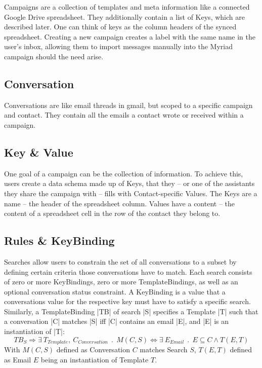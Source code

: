 Campaigns are a collection of templates and meta information like a connected Google Drive spreadsheet. They additionally contain a list of Keys, which are described later. One can think of keys as the column headers of the synced spreadsheet. Creating a new campaign creates a label with the same name in the user's inbox, allowing them to import messages manually into the Myriad campaign should the need arise.

\subsection{Conversation}

Conversations are like email threads in gmail, but scoped to a specific campaign and contact. They contain all the emails a contact wrote or received within a campaign.

\subsection{Key \& Value}


One goal of a campaign can be the collection of information. To achieve this, users create a data schema made up of Keys, that they -- or one of the assistants they share the campaign with -- fills with Contact-specific Values. The Keys are a name – the header of the spreadsheet column. Values have a content – the content of a spreadsheet cell in the row of the contact they belong to.

\subsection{Rules \& KeyBinding}


Searches allow users to constrain the set of all conversations to a subset by defining certain criteria those conversations have to match. Each search consists of zero or more KeyBindings, zero or more TemplateBindings, as well as an optional conversation status constraint. A KeyBinding is a value that a conversations value for the respective key must have to satisfy a specific search. Similarly, a TemplateBinding |TB| of search |S| specifies a Template |T| such that a conversation |C| matches |S| iff |C| contains an email |E|, and |E| is an instantiation of |T|: $$ TB_S \Rightarrow \exists \: T_{Template}, \: C_{Conversation} \: \: . \: \: M(C,S) \Leftrightarrow \exists \: E_{Email} \:\: . \:\: E \subseteq C \land T(E,T) $$  With $M(C,S)$ defined as Conversation $C$ matches Search $S$, $T(E,T)$ defined as Email $E$ being an instantiation of Template $T$.

